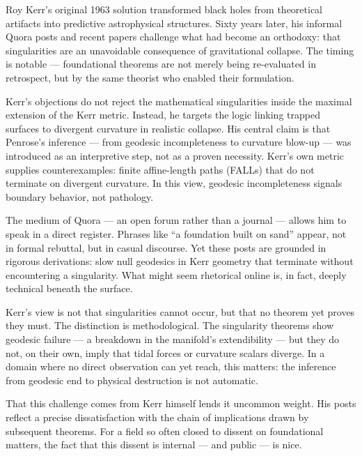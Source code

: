\begin{commentary}
Roy Kerr's original 1963 solution transformed black holes from theoretical artifacts into predictive astrophysical structures. Sixty years later, his informal Quora posts and recent papers challenge what had become an orthodoxy: that singularities are an unavoidable consequence of gravitational collapse. The timing is notable — foundational theorems are not merely being re-evaluated in retrospect, but by the same theorist who enabled their formulation.

Kerr’s objections do not reject the mathematical singularities inside the maximal extension of the Kerr metric. Instead, he targets the logic linking trapped surfaces to divergent curvature in realistic collapse. His central claim is that Penrose’s inference — from geodesic incompleteness to curvature blow-up — was introduced as an interpretive step, not as a proven necessity. Kerr's own metric supplies counterexamples: finite affine-length paths (FALLs) that do not terminate on divergent curvature. In this view, geodesic incompleteness signals boundary behavior, not pathology.

The medium of Quora — an open forum rather than a journal — allows him to speak in a direct register. Phrases like “a foundation built on sand” appear, not in formal rebuttal, but in casual discourse. Yet these posts are grounded in rigorous derivations: slow null geodesics in Kerr geometry that terminate without encountering a singularity. What might seem rhetorical online is, in fact, deeply technical beneath the surface.

Kerr’s view is not that singularities cannot occur, but that no theorem yet proves they must. The distinction is methodological. The singularity theorems show geodesic failure — a breakdown in the manifold’s extendibility — but they do not, on their own, imply that tidal forces or curvature scalars diverge. In a domain where no direct observation can yet reach, this matters: the inference from geodesic end to physical destruction is not automatic.

That this challenge comes from Kerr himself lends it uncommon weight. His posts reflect a precise dissatisfaction with the chain of implications drawn by subsequent theorems. For a field so often closed to dissent on foundational matters, the fact that this dissent is internal — and public — is nice.
\end{commentary}


